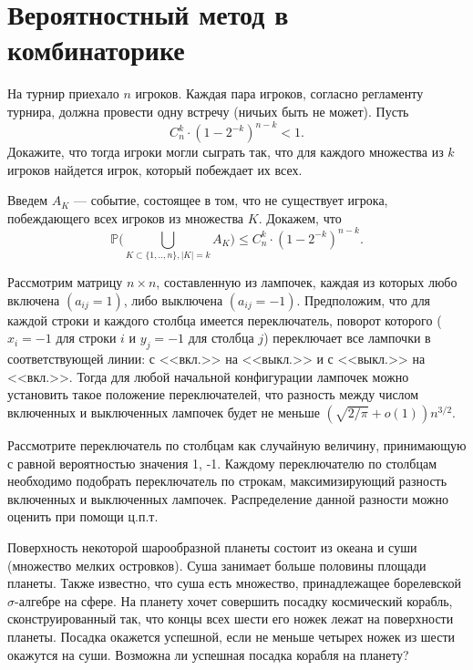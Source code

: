 \section{Вероятностный метод в комбинаторике}

\begin{problem}
На турнир приехало $n$ игроков. Каждая пара игроков, согласно регламенту турнира, должна провести одну встречу (ничьих быть не может). Пусть 
$$
C_n^k\cdot (1-2^{-k})^{n-k}<1 . 
$$
Докажите, что тогда игроки могли сыграть так, что для каждого множества из $k$ игроков найдется игрок, который побеждает их всех. 

\end{problem}

\begin{ordre}
Введем $A_K$ --- событие, состоящее в том, что не существует игрока, побеждающего всех игроков из множества $K$. 
Докажем, что 
$$
{\mathbb P}\bigl(\bigcup\limits_{K\subset\{1,..,n\},|K|=k} A_K \bigr)\leqslant C_n^k\cdot (1-2^{-k})^{n-k} . 
$$

\end{ordre}


\begin{problem}
Рассмотрим матрицу $n\times n$, составленную из лампочек, каждая из которых любо включена $(a_{ij}=1)$, либо выключена $(a_{ij}=-1)$. 
Предположим, что для каждой строки и каждого столбца имеется переключатель, поворот которого ($x_i=-1$ для строки $i$ и 
$y_j=-1$ для столбца $j$) переключает все лампочки в соответствующей линии: с <<вкл.>> на <<выкл.>> и с <<выкл.>> на <<вкл.>>. 
Тогда для любой начальной конфигурации лампочек можно установить такое положение переключателей, что разность между числом включенных и 
выключенных лампочек будет не меньше $(\sqrt{2/\pi}+o(1))n^{3/2}$. 
\end{problem}

\begin{ordre}
Рассмотрите  переключатель по столбцам как случайную величину, принимающую с равной вероятностью значения 1, -1. Каждому переключателю по столбцам необходимо подобрать переключатель по строкам, максимизирующий разность включенных и 
выключенных лампочек. Распределение данной разности можно оценить при помощи ц.п.т.       
\end{ordre}


\begin{problem}
Поверхность некоторой шарообразной планеты состоит из океана и суши (множество мелких островков). Суша занимает больше половины 
площади планеты. Также известно, что суша есть множество, принадлежащее борелевской  $\sigma$-алгебре на сфере. На планету хочет 
совершить посадку космический корабль, сконструированный так, что концы всех шести его ножек лежат на поверхности планеты. 
Посадка окажется успешной, если не меньше четырех ножек из шести окажутся на суши. Возможна ли успешная посадка корабля на планету?
\end{problem}

